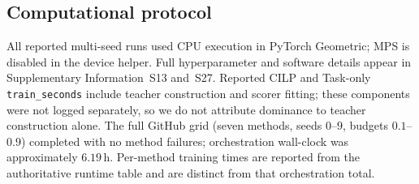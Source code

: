 \subsection{Computational protocol}
All reported multi-seed runs used CPU execution in PyTorch Geometric; MPS is disabled in the device helper.
Full hyperparameter and software details appear in Supplementary Information~S13 and~S27.
Reported CILP and Task-only \texttt{train\_seconds} include teacher construction and scorer fitting; these components were not logged separately, so we do not attribute dominance to teacher construction alone.
The full GitHub grid (seven methods, seeds $0$--$9$, budgets $0.1$--$0.9$) completed with no method failures; orchestration wall-clock was approximately $6.19$\,h.
Per-method training times are reported from the authoritative runtime table and are distinct from that orchestration total.
